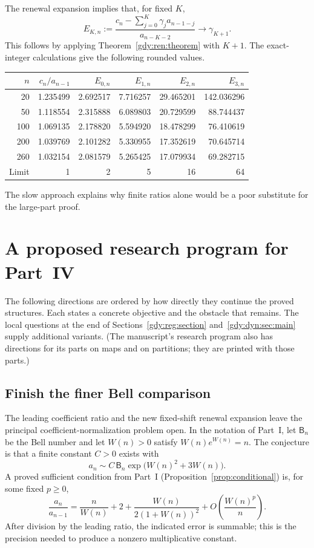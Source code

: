 \documentclass[11pt]{article}
\numberwithin{equation}{section}
\theoremstyle{definition}
\theoremstyle{remark}
\begin{document}
The renewal expansion implies that, for fixed $K$,
\[
 E_{K,n}:=
 \frac{c_n-\sum_{j=0}^{K}\gamma_j a_{n-1-j}}{a_{n-K-2}}
 \longrightarrow \gamma_{K+1}.
\]
This follows by applying Theorem~\ref{gdy:ren:theorem} with $K+1$.
The exact-integer calculations give the following rounded values.
\begin{center}
\small
\begin{tabular}{@{}r r r r r r@{}}
\toprule
$n$ & $c_n/a_{n-1}$ & $E_{0,n}$ & $E_{1,n}$ & $E_{2,n}$ & $E_{3,n}$\\
\midrule
20  &1.235499&2.692517&7.716257&29.465201&142.036296\\
50  &1.118554&2.315888&6.089803&20.729599&88.744437\\
100 &1.069135&2.178820&5.594920&18.478299&76.410619\\
200 &1.039769&2.101282&5.330955&17.352619&70.645714\\
260 &1.032154&2.081579&5.265425&17.079934&69.282715\\
\midrule
Limit &1&2&5&16&64\\
\bottomrule
\end{tabular}
\end{center}
The slow approach explains why finite ratios alone would be a poor
substitute for the large-part proof.

\section{A proposed research program for Part~IV}\label{gdy:future:section}

The following directions are ordered by how directly they continue the
proved structures. Each states a concrete objective and the obstacle
that remains. The local questions at the end of
Sections~\ref{gdy:reg:section} and~\ref{gdy:dyn:sec:main} supply
additional variants. (The manuscript's research program also has
directions for its parts on maps and on partitions; they are printed with
those parts.)

\subsection{Finish the finer Bell comparison}

The leading coefficient ratio and the new fixed-shift renewal expansion
leave the principal coefficient-normalization problem open. In the
notation of Part~I, let $\mathsf B_n$ be the Bell number and
let $W(n)>0$ satisfy $W(n)e^{W(n)}=n$. The conjecture is that a finite
constant $C>0$ exists with
\begin{equation}\label{gdy:future:bell}
 a_n\sim C\,\mathsf B_n
          \exp\!\bigl(W(n)^2+3W(n)\bigr).
\end{equation}
A proved sufficient condition from Part~I
(Proposition~\ref{prop:conditional}) is, for some fixed $p\ge0$,
\begin{equation}\label{gdy:future:ratio}
 \frac{a_n}{a_{n-1}}
 =\frac n{W(n)}+2+\frac{W(n)}{2(1+W(n))^2}
             +O\!\left(\frac{W(n)^p}{n}\right).
\end{equation}
After division by the leading ratio, the indicated error is summable;
this is the precision needed to produce a nonzero multiplicative
constant.
\end{document}
